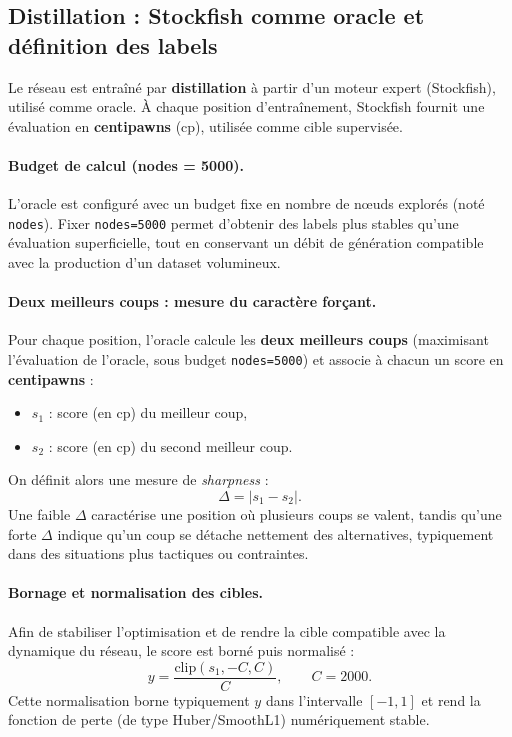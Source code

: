 \documentclass[11pt, a4paper]{article}
\begin{document}
\subsection{Distillation : Stockfish comme oracle et définition des labels}
Le réseau est entraîné par \textbf{distillation} à partir d'un moteur expert (Stockfish), utilisé comme oracle. À chaque position d'entraînement, Stockfish fournit une évaluation en \textbf{centipawns} (cp), utilisée comme cible supervisée.

\paragraph{Budget de calcul (nodes = 5000).}
L'oracle est configuré avec un budget fixe en nombre de nœuds explorés (noté \texttt{nodes}). Fixer \texttt{nodes=5000} permet d'obtenir des labels plus stables qu'une évaluation superficielle, tout en conservant un débit de génération compatible avec la production d'un dataset volumineux.

\paragraph{Deux meilleurs coups : mesure du caractère forçant.}
Pour chaque position, l'oracle calcule les \textbf{deux meilleurs coups} (maximisant l'évaluation de l'oracle, sous budget \texttt{nodes=5000}) et associe à chacun un score en \textbf{centipawns} :
\begin{itemize}
    \item $s_1$ : score (en cp) du meilleur coup,
    \item $s_2$ : score (en cp) du second meilleur coup.
\end{itemize}
On définit alors une mesure de \textit{sharpness} :
\begin{equation}
    \Delta = |s_1 - s_2|.
\end{equation}
Une faible $\Delta$ caractérise une position où plusieurs coups se valent, tandis qu'une forte $\Delta$ indique qu'un coup se détache nettement des alternatives, typiquement dans des situations plus tactiques ou contraintes.

\paragraph{Bornage et normalisation des cibles.}
Afin de stabiliser l'optimisation et de rendre la cible compatible avec la dynamique du réseau, le score est borné puis normalisé :
\begin{equation}
    y = \frac{\mathrm{clip}(s_1, -C, C)}{C}, \qquad C = 2000.
\end{equation}
Cette normalisation borne typiquement $y$ dans l'intervalle $[-1,1]$ et rend la fonction de perte (de type Huber/SmoothL1) numériquement stable.
\end{document}
